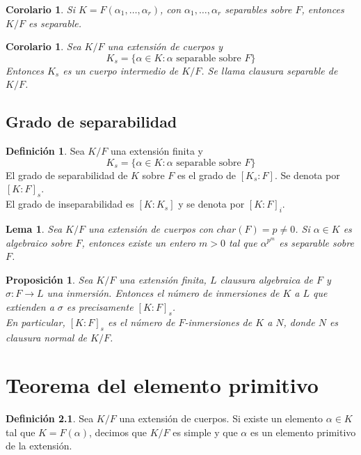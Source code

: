 \documentclass{report}
\newtheorem{corollary}[theorem]{Corolario}
\newtheorem{lemma}[theorem]{Lema}
\newtheorem{proposition}[theorem]{Proposición}
\theoremstyle{remark}
\theoremstyle{definition}
\newtheorem{definition}{Definición}[chapter]
\theoremstyle{definition}
\theoremstyle{definition}
\begin{document}
\begin{corollary}
    Si $K = F(\alpha_1, \dots, \alpha_r)$, con $\alpha_1, \dots, \alpha_r$ separables sobre $F$, entonces $K/F$ es separable.
\end{corollary}

\begin{corollary}
    Sea $K/F$ una extensión de cuerpos y
    $$K_s = \{ \alpha \in K : \alpha \text{ separable sobre } F \}$$
    Entonces $K_s$ es un cuerpo intermedio de $K/F$. Se llama clausura separable de $K/F$.
\end{corollary}

\section{Grado de separabilidad}

\begin{definition}
    Sea $K/F$ una extensión finita y
    $$K_s = \{ \alpha \in K : \alpha \text{ separable sobre } F \}$$
    El grado de separabilidad de $K$ sobre $F$ es el grado de $[K_s : F]$. Se denota por $[K : F]_s$.\\
    El grado de inseparabilidad es $[K : K_s]$ y se denota por $[K : F]_i$.
\end{definition}

\begin{lemma}
    Sea $K/F$ una extensión de cuerpos con $char(F) = p \neq 0$.
    Si $\alpha \in K$ es algebraico sobre $F$, entonces existe un entero $m > 0$ tal que $\alpha^{p^m}$ es separable sobre $F$.
\end{lemma}

\begin{proposition}
    Sea $K/F$ una extensión finita, $L$ clausura algebraica de $F$ y $\sigma : F \to L$ una inmersión.
    Entonces el número de inmersiones de $K$ a $L$ que extienden a $\sigma$ es precisamente $[K : F]_s$.\\
    En particular, $[K : F]_s$ es el número de $F$-inmersiones de $K$ a $N$, donde $N$ es clausura normal de $K/F$.
\end{proposition}

\chapter{Teorema del elemento primitivo}

\begin{definition}
    Sea $K/F$ una extensión de cuerpos. Si existe un elemento $\alpha \in K$ tal que $K = F(\alpha)$, decimos que $K/F$ es simple y que $\alpha$ es un elemento primitivo de la extensión.
\end{definition}
\end{document}
